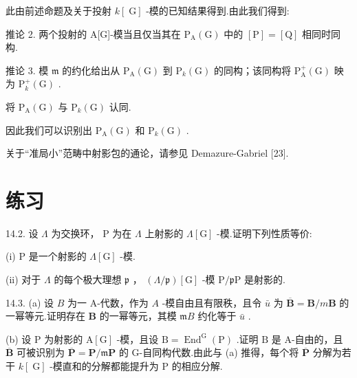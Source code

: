 \documentclass[10pt]{article}
\begin{document}
此由前述命题及关于投射 \(k\left\lbrack  \mathrm{\;G}\right\rbrack\) -模的已知结果得到.由此我们得到:

推论 2. 两个投射的 A[G]-模当且仅当其在 \({\mathrm{P}}_{\mathrm{A}}\left( \mathrm{G}\right)\) 中的 \(\left\lbrack  \mathrm{P}\right\rbrack   = \left\lbrack  \mathrm{Q}\right\rbrack\) 相同时同构.

推论 3. 模 \(\mathfrak{m}\) 的约化给出从 \({\mathrm{P}}_{\mathrm{A}}\left( \mathrm{G}\right)\) 到 \({\mathrm{P}}_{k}\left( \mathrm{G}\right)\) 的同构；该同构将 \({\mathrm{P}}_{\mathrm{A}}^{ + }\left( \mathrm{G}\right)\) 映为 \({\mathrm{P}}_{k}^{ + }\left( \mathrm{G}\right)\) .

将 \({\mathrm{P}}_{\mathrm{A}}\left( \mathrm{G}\right)\) 与 \({\mathrm{P}}_{k}\left( \mathrm{G}\right)\) 认同.

因此我们可以识别出 \({\mathrm{P}}_{\mathrm{A}}\left( \mathrm{G}\right)\) 和 \({\mathrm{P}}_{k}\left( \mathrm{G}\right)\) .

关于“准局小”范畴中射影包的通论，请参见 Demazure-Gabriel [23].

\section*{练习}

14.2. 设 \(\Lambda\) 为交换环， \(\mathrm{P}\) 为在 \(\Lambda\) 上射影的 \(\Lambda \left\lbrack  \mathrm{G}\right\rbrack\) -模.证明下列性质等价:

(i) \(\mathrm{P}\) 是一个射影的 \(\Lambda \left\lbrack  \mathrm{G}\right\rbrack\) -模.

(ii) 对于 \(\Lambda\) 的每个极大理想 \(\mathfrak{p}\) ， \(\left( {\Lambda /\mathfrak{p}}\right) \left\lbrack  \mathrm{G}\right\rbrack\) -模 \(\mathrm{P}/\mathfrak{p}\mathrm{P}\) 是射影的.

14.3. (a) 设 \(B\) 为一 A-代数，作为 \(A\) -模自由且有限秩，且令 \(\bar{u}\) 为 \(\overline{\mathbf{B}} = \mathbf{B}/m\mathbf{B}\) 的一幂等元.证明存在 \(\mathbf{B}\) 的一幂等元，其模 \(\mathfrak{m}B\) 约化等于 \(\bar{u}\) .

(b) 设 \(\mathrm{P}\) 为射影的 \(\mathrm{A}\left\lbrack  \mathrm{G}\right\rbrack\) -模，且设 \(\mathrm{B} = {\operatorname{End}}^{\mathrm{G}}\left( \mathrm{P}\right)\) .证明 \(\mathrm{B}\) 是 A-自由的，且 \(\overline{\mathbf{B}}\) 可被识别为 \(\overline{\mathbf{P}} = \mathbf{P}/\mathfrak{m}\mathbf{P}\) 的 G-自同构代数.由此与 (a) 推得，每个将 \(\overline{\mathbf{P}}\) 分解为若干 \(k\left\lbrack  \mathrm{\;G}\right\rbrack\) -模直和的分解都能提升为 P 的相应分解.
\end{document}
